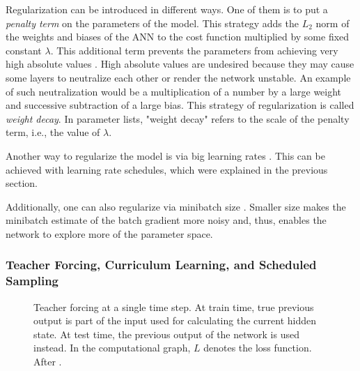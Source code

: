Regularization can be introduced in different ways. One of them is to put a \emph{penalty term} on the parameters of the model. This strategy adds the $L_2$ norm of the weights and biases of the \ac{ANN} to the cost function multiplied by some fixed constant $\lambda$. This additional term prevents the parameters from achieving very high absolute values \cite{Goodfellow-et-al-2016}. High absolute values are undesired because they may cause some layers to neutralize each other or render the network unstable. An example of such neutralization would be a multiplication of a number by a large weight and successive subtraction of a large bias. This strategy of regularization is called \emph{weight decay}. In parameter lists, "weight decay" refers to the scale of the penalty term, i.e., the value of $\lambda$.

Another way to regularize the model is via big learning rates \cite{Smith2018}. This can be achieved with learning rate schedules, which were explained in the previous section.

Additionally, one can also regularize via minibatch size \cite{Bengio2012}. Smaller size makes the minibatch estimate of the batch gradient more noisy and, thus, enables the network to explore more of the parameter space.

\subsubsection{Teacher Forcing, Curriculum Learning, and Scheduled Sampling}
\label{subsec:teacher_forcing}

\begin{figure}
    \centering
    \scalebox{0.6}{}
    \caption{Teacher forcing at a single time step. At train time, true previous output is part of the input used for calculating the current hidden state. At test time, the previous output of the network is used instead. In the computational graph, $L$ denotes the loss function. After \cite{Goodfellow-et-al-2016}.}
    \label{fig:teacher_forcing}
\end{figure}

